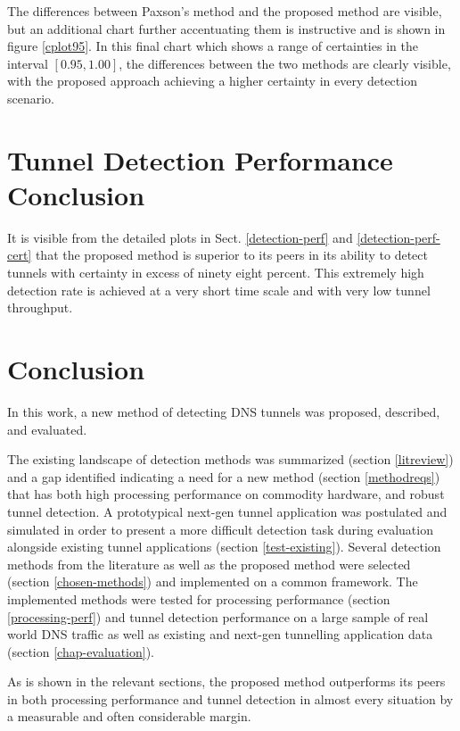 \documentclass{llncs}
\begin{document}
The differences between Paxson's method and the proposed method are visible, but
an additional chart further accentuating them is instructive and is shown in
figure \ref{cplot95}. In this final chart which shows a range of certainties in
the interval $[0.95,1.00]$, the differences between the two methods are clearly
visible, with the proposed approach achieving a higher certainty in every
detection scenario.

\section{Tunnel Detection Performance Conclusion}
It is visible from the detailed plots in Sect. \ref{detection-perf} and
\ref{detection-perf-cert} that the proposed method is superior to its peers in
its ability to detect tunnels with certainty in excess of ninety eight percent.
This extremely high detection rate is achieved at a very short time scale and
with very low tunnel throughput.

\section{Conclusion}
\label{conclusion}

In this work, a new method of detecting DNS tunnels was proposed, described, and
evaluated.

The existing landscape of detection methods was summarized (section
\ref{litreview}) and a gap identified indicating a need for a new method
(section \ref{methodreqs}) that has both high processing performance on
commodity hardware, and robust tunnel detection. A prototypical next-gen tunnel
application was postulated and simulated in order to present a more difficult detection
task during evaluation alongside existing tunnel applications (section
\ref{test-existing}). Several detection methods from the literature as well as
the proposed method were selected (section \ref{chosen-methods}) and implemented
on a common framework. The implemented methods
were tested for processing performance (section \ref{processing-perf}) and
tunnel detection performance on a large sample of real world DNS traffic as well
as existing and next-gen tunnelling application data (section
\ref{chap-evaluation}).

As is shown in the relevant sections, the proposed method outperforms its peers
in both processing performance and tunnel detection in almost every situation by
a measurable and often considerable margin.
\end{document}
